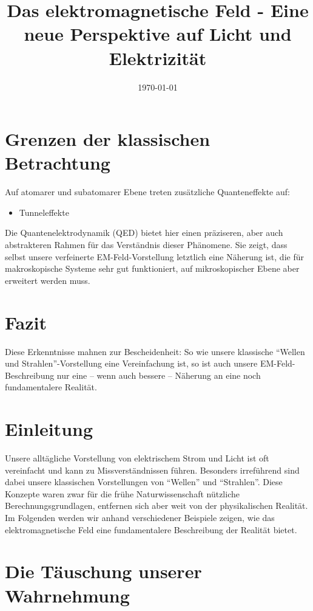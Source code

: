 \documentclass[12pt,a4paper]{article}
\begin{document}
	\section{Grenzen der klassischen Betrachtung}
	Auf atomarer und subatomarer Ebene treten zusätzliche Quanteneffekte auf:
	\begin{itemize}
		\item Tunneleffekte
	\end{itemize}
	
	Die Quantenelektrodynamik (QED) bietet hier einen präziseren, aber auch abstrakteren Rahmen für das Verständnis dieser Phänomene. Sie zeigt, dass selbst unsere verfeinerte EM-Feld-Vorstellung letztlich eine Näherung ist, die für makroskopische Systeme sehr gut funktioniert, auf mikroskopischer Ebene aber erweitert werden muss.
	
	\section*{Fazit}
	Diese Erkenntnisse mahnen zur Bescheidenheit: So wie unsere klassische ``Wellen und Strahlen''-Vorstellung eine Vereinfachung ist, so ist auch unsere EM-Feld-Beschreibung nur eine -- wenn auch bessere -- Näherung an eine noch fundamentalere Realität.
	


\title{Das elektromagnetische Feld - Eine neue Perspektive auf Licht und Elektrizität}
\author{}
\date{\today}

	
	\maketitle
	
	\section*{Einleitung}
	Unsere alltägliche Vorstellung von elektrischem Strom und Licht ist oft vereinfacht und kann zu Missverständnissen führen. Besonders irreführend sind dabei unsere klassischen Vorstellungen von ``Wellen'' und ``Strahlen''. Diese Konzepte waren zwar für die frühe Naturwissenschaft nützliche Berechnungsgrundlagen, entfernen sich aber weit von der physikalischen Realität. Im Folgenden werden wir anhand verschiedener Beispiele zeigen, wie das elektromagnetische Feld eine fundamentalere Beschreibung der Realität bietet.
	
	\section{Die Täuschung unserer Wahrnehmung}
\end{document}
